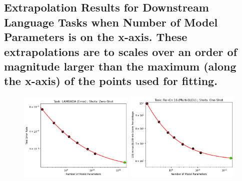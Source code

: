 \documentclass{article} %
\begin{document}
\fi

\clearpage

\subsection{Extrapolation Results for Downstream Language Tasks when Number of Model Parameters is on the x-axis. \newline These extrapolations are to scales over an order of magnitude larger than the maximum (along the x-axis) of the points used for fitting.}
\label{section:language_tasks__number_of_parameters}
\begin{figure}[htbp]
    \centering

\includegraphics[width=0.49\textwidth]{figures/gpt-3__parameter_scaling/LAMBADA__Error____Zero-Shot.png} \includegraphics[width=0.49\textwidth]{figures/gpt-3__parameter_scaling/Ro_to_En_16__Multi-BLEU____One-Shot.png}


\end{figure}
\end{document}
